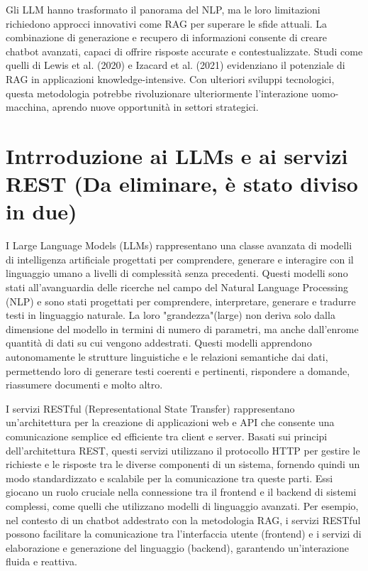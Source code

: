 \documentclass[a4paper,twoside,12pt]{toptesi}
\begin{document}
Gli LLM hanno trasformato il panorama del NLP, ma le loro limitazioni richiedono approcci innovativi come RAG per superare le sfide attuali. La combinazione di generazione e recupero di informazioni consente di creare chatbot avanzati, capaci di offrire risposte accurate e contestualizzate. Studi come quelli di Lewis et al. (2020) e Izacard et al. (2021) evidenziano il potenziale di RAG in applicazioni knowledge-intensive. Con ulteriori sviluppi tecnologici, questa metodologia potrebbe rivoluzionare ulteriormente l'interazione uomo-macchina, aprendo nuove opportunità in settori strategici.


\chapter{Intrroduzione ai LLMs e ai servizi REST (Da eliminare, è stato diviso in due)}

I Large Language Models (LLMs) rappresentano una classe avanzata di modelli di intelligenza artificiale progettati per comprendere, generare e interagire con il linguaggio umano a livelli di complessità senza precedenti. Questi modelli sono stati all’avanguardia delle ricerche nel campo del Natural Language Processing (NLP) e sono stati progettati per comprendere, interpretare, generare e tradurre testi in linguaggio naturale. La loro "grandezza"(large) non deriva solo dalla dimensione del modello in termini di numero di parametri, ma anche dall’enrome quantità di dati su cui vengono addestrati. Questi modelli apprendono autonomamente le strutture linguistiche e le relazioni semantiche dai dati, permettendo loro di generare testi coerenti e pertinenti, rispondere a domande, riassumere documenti e molto altro.

I servizi RESTful (Representational State Transfer) rappresentano un'architettura per la creazione di applicazioni web e API che consente una comunicazione semplice ed efficiente tra client e server. Basati sui principi dell'architettura REST, questi servizi utilizzano il protocollo HTTP per gestire le richieste e le risposte tra le diverse componenti di un sistema, fornendo quindi un modo standardizzato e scalabile per la comunicazione tra queste parti. Essi giocano un ruolo cruciale nella connessione tra il frontend e il backend di sistemi complessi, come quelli che utilizzano modelli di linguaggio avanzati. Per esempio, nel contesto di un chatbot addestrato con la metodologia RAG, i servizi RESTful possono facilitare la comunicazione tra l'interfaccia utente (frontend) e i servizi di elaborazione e generazione del linguaggio (backend), garantendo un'interazione fluida e reattiva.
\end{document}
